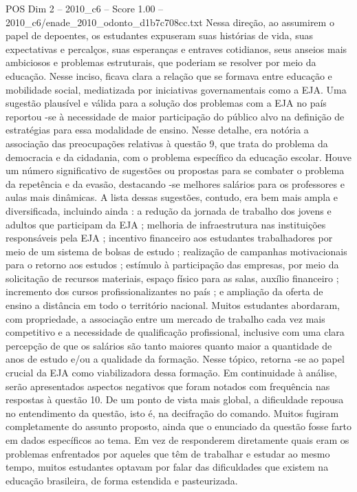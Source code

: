 \begin{textsample}{POS Dim 2 – 2010\_c6 – Score 1.00 – 2010\_c6/enade\_2010\_odonto\_d1b7c708cc.txt}
Nessa direção, ao assumirem o papel de depoentes, os estudantes expuseram suas histórias de vida, suas expectativas e percalços, suas esperanças e entraves cotidianos, seus anseios mais ambiciosos e problemas estruturais, que poderiam se resolver por meio da educação.
Nesse inciso, ficava clara a relação que se formava entre educação e mobilidade social, mediatizada por iniciativas governamentais como a EJA.
Uma sugestão plausível e válida para a solução dos problemas com a EJA no país reportou -se à necessidade de maior participação do público alvo na definição de estratégias para essa modalidade de ensino.
Nesse detalhe, era notória a associação das preocupações relativas à questão 9, que trata do problema da democracia e da cidadania, com o problema específico da educação escolar.
Houve um número significativo de sugestões ou propostas para se combater o problema da repetência e da evasão, destacando -se melhores salários para os professores e aulas mais dinâmicas.
A lista dessas sugestões, contudo, era bem mais ampla e diversificada, incluindo ainda : a redução da jornada de trabalho dos jovens e adultos que participam da EJA ; melhoria de infraestrutura nas instituições responsáveis pela EJA ; incentivo financeiro aos estudantes trabalhadores por meio de um sistema de bolsas de estudo ; realização de campanhas motivacionais para o retorno aos estudos ; estímulo à participação das empresas, por meio da solicitação de recursos materiais, espaço físico para as salas, auxílio financeiro ; incremento dos cursos profissionalizantes no país ; e ampliação da oferta de ensino a distância em todo o território nacional.
Muitos estudantes abordaram, com propriedade, a associação entre um mercado de trabalho cada vez mais competitivo e a necessidade de qualificação profissional, inclusive com uma clara percepção de que os salários são tanto maiores quanto maior a quantidade de anos de estudo e/ou a qualidade da formação.
Nesse tópico, retorna -se ao papel crucial da EJA como viabilizadora dessa formação.
Em continuidade à análise, serão apresentados aspectos negativos que foram notados com frequência nas respostas à questão 10.
De um ponto de vista mais global, a dificuldade repousa no entendimento da questão, isto é, na decifração do comando.
Muitos fugiram completamente do assunto proposto, ainda que o enunciado da questão fosse farto em dados específicos ao tema.
Em vez de responderem diretamente quais eram os problemas enfrentados por aqueles que têm de trabalhar e estudar ao mesmo tempo, muitos estudantes optavam por falar das dificuldades que existem na educação brasileira, de forma estendida e pasteurizada.

\end{textsample}
